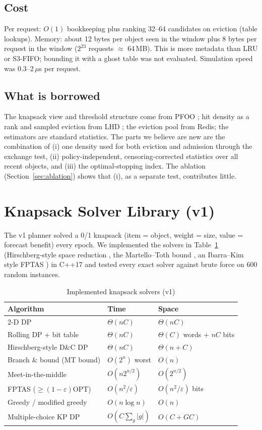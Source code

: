 \documentclass[conference]{IEEEtran}
\begin{document}
\subsection{Cost}
Per request: $O(1)$ bookkeeping plus ranking 32--64 candidates on eviction (table lookups). Memory: about 12 bytes
per object seen in the window plus 8 bytes per request in the window ($2^{23}$ requests $\approx$ 64\,MB). This is
more metadata than LRU or S3-FIFO; bounding it with a ghost table was not evaluated. Simulation speed was
0.3--2\,$\mu$s per request.

\subsection{What is borrowed}
The knapsack view and threshold structure come from PFOO \cite{pfoo}; hit density as a rank and sampled eviction
from LHD \cite{lhd}; the eviction pool from Redis; the estimators are standard statistics. The parts we believe are
new are the combination of (i) one density used for both eviction and admission through the exchange test,
(ii) policy-independent, censoring-corrected statistics over all recent objects, and (iii) the optimal-stopping
index. The ablation (Section~\ref{sec:ablation}) shows that (i), as a separate test, contributes little.

\section{Knapsack Solver Library (v1)}\label{sec:solvers}
The v1 planner solved a 0/1 knapsack (item = object, weight = size, value = forecast benefit) every epoch. We
implemented the solvers in Table~\ref{tab:solvers} (Hirschberg-style space reduction \cite{hirschberg}, the Martello--Toth bound \cite{mt}, an Ibarra--Kim style FPTAS \cite{ibarra}) in C++17 and tested every exact solver against brute force on
600 random instances.

\begin{table}[t]
\centering
\caption{Implemented knapsack solvers (v1)}\label{tab:solvers}
\begin{tabular}{@{}lll@{}}
\toprule
Algorithm & Time & Space \\
\midrule
2-D DP & $\Theta(nC)$ & $\Theta(nC)$ \\
Rolling DP + bit table & $\Theta(nC)$ & $\Theta(C)$ words + $nC$ bits \\
Hirschberg-style D\&C DP & $\Theta(nC)$ & $\Theta(n+C)$ \\
Branch \& bound (MT bound) & $O(2^n)$ worst & $O(n)$ \\
Meet-in-the-middle & $O(n2^{n/2})$ & $O(2^{n/2})$ \\
FPTAS ($\ge(1-\varepsilon)$OPT) & $O(n^2/\varepsilon)$ & $O(n^2/\varepsilon)$ bits \\
Greedy / modified greedy & $O(n\log n)$ & $O(n)$ \\
Multiple-choice KP DP & $O(C\sum_g|g|)$ & $O(C+GC)$ \\
\bottomrule
\end{tabular}
\end{table}
\end{document}
